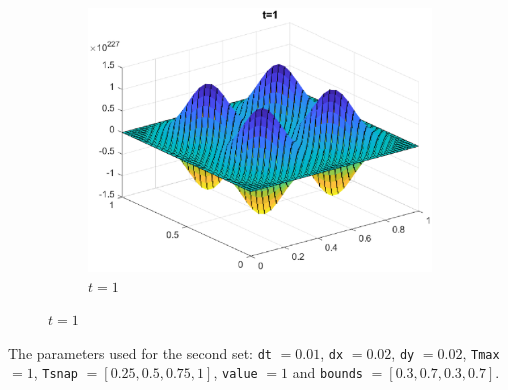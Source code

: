 \documentclass[]{article}
\def\incode#1{\texttt{#1}}
\begin{document}
	\begin{figure}[htbp]
	\centering	
		\vspace{1em}
		
		\begin{subfigure}[b]{0.45\textwidth}
			\includegraphics[width=\textwidth]{images/h1_t4.eps}
			\caption{$t = 1$}
			\label{fig:image7}
		\end{subfigure}


		\label{fig:all_images}
	\end{figure}
	\newpage 
	The parameters used for the second set: \incode{dt} $= 0.01$, \incode{dx} $= 0.02$, \incode{dy} $= 0.02$, \incode{Tmax} $= 1$, \incode{Tsnap} $= [0.25, 0.5, 0.75, 1]$, \incode{value} $= 1$ and \incode{bounds} $= [0.3, 0.7, 0.3, 0.7]$. 
	
\end{document}
